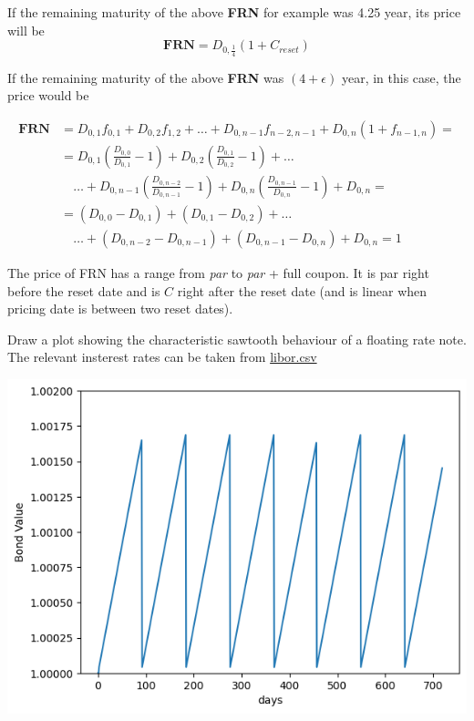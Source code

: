 \documentclass[12pt,a4paper]{article}
\begin{document}
If the remaining maturity of the above \textbf{FRN} for example was 4.25 year, its price will be
\begin{equation}
	\textbf{FRN} = D_{0,\frac{1}{4}}(1+C_{reset})
\end{equation}

If the remaining maturity of the above \textbf{FRN} was $(4 + \epsilon)$ year, in this case, the price would be

\begin{equation}
	\begin{aligned}
		\textbf{FRN} &= D_{0,1}f_{0,1}+ D_{0,2}f_{1,2} + \ldots + D_{0,n-1}f_{n-2,n-1} + D_{0,n}(1+f_{n-1,n}) = \\
		& = D_{0,1}\left(\frac{D_{0,0}}{D_{0,1}}-1\right) + D_{0,2}\left(\frac{D_{0,1}}{D_{0,2}}-1\right) + \ldots \\
		&\quad\ldots + D_{0,n-1}\left(\frac{D_{0,n-2}}{D_{0,n-1}}-1\right) + D_{0,n}\left(\frac{D_{0,n-1}}{D_{0,n}}-1\right) + D_{0,n} = \\
		&= (D_{0,0}-D_{0,1})+(D_{0,1}-D_{0,2}) + \ldots \\
		&\quad\ldots + (D_{0,n-2}-D_{0,n-1})+(D_{0,n-1}-D_{0,n})+D_{0,n} = 1
	\end{aligned}
\end{equation}

The price of FRN has a range from \emph{par} to \emph{par} + full coupon. It is par right before the reset date and is $C$ right after the reset date (and is linear when pricing date is between two reset dates).

\begin{question}
	Draw a plot showing the characteristic sawtooth behaviour of a floating rate note. The relevant insterest rates can be taken from \href{https://raw.githubusercontent.com/matteosan1/advanced\_financial\_modeling/master/input_files/libor.csv}{libor.csv}
	
	\begin{center}
		\includegraphics[width=0.6\linewidth]{addons/floating_rate_note}
	\end{center}
\end{question}
\clearpage
\end{document}
